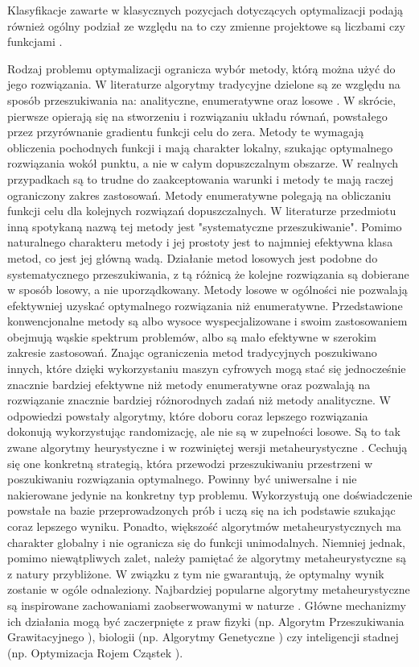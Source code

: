 Klasyfikacje zawarte w klasycznych pozycjach dotyczących optymalizacji podają również ogólny podział ze względu na to czy zmienne projektowe są liczbami czy funkcjami \parencite{Szymczak1995,Findeisen1980}.

Rodzaj problemu optymalizacji ogranicza wybór metody, którą można użyć do jego rozwiązania. W literaturze algorytmy tradycyjne dzielone są ze względu na sposób przeszukiwania na: analityczne, enumeratywne oraz losowe \parencite{Goldberg1995}. W skrócie, pierwsze opierają się na stworzeniu i rozwiązaniu układu równań, powstałego przez przyrównanie gradientu funkcji celu do zera. Metody te wymagają obliczenia pochodnych funkcji i mają charakter lokalny, szukając optymalnego rozwiązania wokół punktu, a nie w całym dopuszczalnym obszarze. W realnych przypadkach są to trudne do zaakceptowania warunki i metody te mają raczej ograniczony zakres zastosowań. Metody enumeratywne polegają na obliczaniu funkcji celu dla kolejnych rozwiązań dopuszczalnych. W literaturze przedmiotu inną spotykaną nazwą tej metody jest "systematyczne przeszukiwanie". Pomimo naturalnego charakteru metody i jej prostoty jest to najmniej efektywna klasa metod, co jest jej główną wadą. Działanie metod losowych jest podobne do systematycznego przeszukiwania, z tą różnicą że kolejne rozwiązania są dobierane w sposób losowy, a nie uporządkowany. Metody losowe w ogólności nie pozwalają efektywniej uzyskać optymalnego rozwiązania niż enumeratywne. Przedstawione konwencjonalne metody są albo wysoce wyspecjalizowane i swoim zastosowaniem obejmują wąskie spektrum problemów, albo są mało efektywne w szerokim zakresie zastosowań. Znając ograniczenia metod tradycyjnych poszukiwano innych, które dzięki wykorzystaniu maszyn cyfrowych mogą stać się jednocześnie znacznie bardziej efektywne niż metody enumeratywne oraz pozwalają na rozwiązanie znacznie bardziej różnorodnych zadań niż metody analityczne. W odpowiedzi powstały algorytmy, które doboru coraz lepszego rozwiązania dokonują wykorzystując randomizację, ale nie są w zupełności losowe. Są to tak zwane algorytmy heurystyczne i w rozwiniętej wersji metaheurystyczne \parencite{Blum2003}. Cechują się one konkretną strategią, która przewodzi przeszukiwaniu przestrzeni w poszukiwaniu rozwiązania optymalnego. Powinny być uniwersalne i nie nakierowane jedynie na konkretny typ problemu. Wykorzystują one doświadczenie powstałe na bazie przeprowadzonych prób i uczą się na ich podstawie szukając coraz lepszego wyniku. Ponadto, większość algorytmów metaheurystycznych ma charakter globalny i nie ogranicza się do funkcji unimodalnych. Niemniej jednak, pomimo niewątpliwych zalet, należy pamiętać że algorytmy metaheurystyczne są z natury przybliżone. W związku z tym nie gwarantują, że optymalny wynik zostanie w ogóle odnaleziony. Najbardziej popularne algorytmy metaheurystyczne są inspirowane zachowaniami zaobserwowanymi w naturze \parencite{FisterJr.2013}. Główne mechanizmy ich działania mogą być zaczerpnięte z praw fizyki (np. Algorytm Przeszukiwania Grawitacyjnego \parencite{Rashedi2009}), biologii (np. Algorytmy Genetyczne \parencite{Goldberg1995}) czy inteligencji stadnej (np. Optymizacja Rojem Cząstek \parencite{Kennedy1995,Eberhart2001}).
